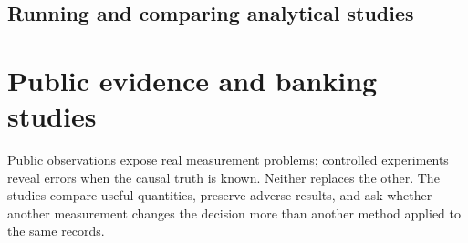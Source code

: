 \documentclass[11pt,a4paper,openany]{book}
\begin{document}




























\chapter{Running and comparing analytical studies}









\part{Public evidence and banking studies}
\label{reading:part-evidence}
Public observations expose real measurement problems; controlled
experiments reveal errors when the causal truth is known. Neither replaces
the other. The studies compare useful quantities, preserve adverse results,
and ask whether another measurement changes the decision more than another
method applied to the same records.
\end{document}
